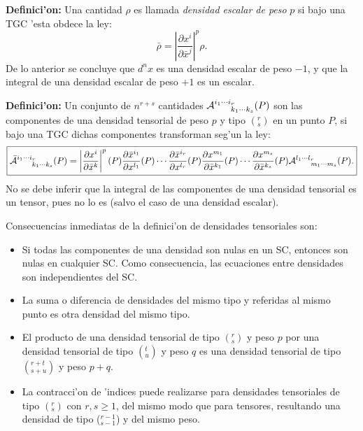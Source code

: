  \textbf{Definici'on:} Una cantidad $\rho$ es llamada \textit{densidad escalar
 de peso} $p$ si bajo una TGC 'esta obdece la ley:
 \begin{equation}
 \bar{\rho}=\left| \frac{\partial x^i }{\partial\bar{x}^j }\right| ^p%
 \rho. \label{den6}%
 \end{equation}
 De lo anterior se concluye que $d^nx$ es una densidad escalar de peso $-1$,
 y que la integral de una densidad escalar de peso $+1$ es un escalar.

 \textbf{Definici'on:} Un conjunto de $n^{r+s}$ cantidades ${\cal A}_{\ \ \ \ \
 k_1\cdots k_{s}}^{i_1\cdots i_{r}}(P)$ son las componentes de una densidad
 tensorial de peso $p$ y tipo $(^r_s)$ en un punto $P$, si bajo una TGC dichas
 componentes transforman seg'un la ley:
 \begin{equation}
 \boxed{\bar{{\cal A}}_{\ \ \ \ \ k_1\cdots k_{s}}^{i_1\cdots
 i_{r}}(P)=\left| \frac{\partial
 x^i }{\partial\bar{x}^k }\right|^p(P) \frac{\partial\bar{x}^{i_1}%
 }{\partial x^{l_1}}(P)\cdots \frac{\partial\bar{x}^{i_{r}}}{\partial
 x^{l_{r}}}(P)\frac{\partial x^{m_1}}{\partial\bar{x}^{k_1}}(P)\cdots
 \frac{\partial x^{m_{s}}}{\partial\bar{x}^{k_{s}}}(P){\cal A}_{\ \ \ \ \
 m_1\cdots m_{s}}^{l_1\cdots l_{r}}(P).}
 \label{den7}%
 \end{equation}
 No se debe inferir que la integral de las componentes de una densidad
 tensorial es un tensor, pues no lo es (salvo el caso de una densidad escalar).

 Consecuencias inmediatas de la definici'on de densidades tensoriales son:
 \begin{itemize}
 \item Si todas las componentes de una densidad son nulas en un SC, entonces
 son nulas en cualquier SC. Como consecuencia, las ecuaciones entre densidades
 son independientes del SC.
 \item La suma o diferencia de densidades del mismo tipo y referidas al mismo
 punto es otra densidad del mismo tipo.
 \item El producto de una densidad tensorial de tipo $(^r_s)$ y peso $p$ por
 una densidad tensorial de tipo $(^t_u)$ y peso $q$ es una densidad tensorial
 de tipo $(^{r+t}_{s+u})$ y peso $p+q$.
 \item La contracci'on de 'indices puede realizarse para densidades
 tensoriales de tipo $(^r_s)$ con $r,s\geq1$, del mismo modo que para tensores,
 resultando una densidad de tipo ($_{s-1}^{r-1}$) y del mismo peso.
 \end{itemize}

